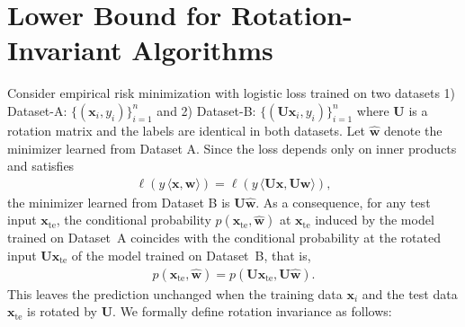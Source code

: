 \documentclass{article}
\theoremstyle{plain}
\theoremstyle{definition}
\theoremstyle{remark}
\begin{document}







\section{Lower Bound for Rotation-Invariant Algorithms}
 Consider empirical risk minimization with logistic loss trained on two datasets 1) Dataset-A: $\{(\mathbf{x}_i, y_i)\}_{i=1}^n$ and 2) Dataset-B: $\{(\boldsymbol{U} \mathbf{x}_i, y_i)\}_{i=1}^n$ where $\boldsymbol{U}$ is a rotation matrix and the labels are identical in both datasets. Let $\mathbf{\hat w}$ denote the minimizer learned from Dataset A. Since the loss depends only on inner products and satisfies
\begin{align}
    \ell\!\left(y\,\langle \mathbf x, \mathbf w\rangle\right)
=
\ell\!\left(y\,\langle \boldsymbol{U}\mathbf x, \boldsymbol{U}\mathbf w\rangle\right),
\end{align}
the minimizer learned from Dataset B is $\boldsymbol{U} \hat {\mathbf{w}}$. As a consequence, for any test input $\mathbf{x}_{\mathrm{te}}$, the conditional probability $p(\mathbf{x}_{\mathrm{te}},\mathbf{\hat w})$ at $\mathbf{x}_{\mathrm{te}}$ induced by the model trained on Dataset~A  coincides with the conditional probability at the rotated input $\boldsymbol{U} \mathbf{x}_{\mathrm{te}}$ of the model trained on Dataset~B, that is,
\begin{align}
   p(\mathbf{x}_{\mathrm{te}},\mathbf{\hat w}) = p(\boldsymbol{U}\mathbf{x}_{\mathrm{te}},\boldsymbol{U}\mathbf{\hat w}).
\end{align}
This leaves the prediction unchanged when the training data $\mathbf{x}_{i}$ and the test data $\mathbf{x}_{\mathrm{te}}$ is rotated by $\boldsymbol{U}$. We formally define rotation invariance as follows:
\end{document}
